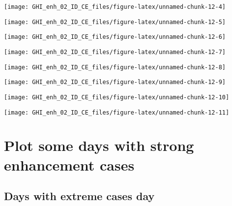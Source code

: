 \documentclass[
  10pt,
  a4paper,oneside]{article}
\begin{document}
\begin{center}\texttt{[image: GHI\_enh\_02\_ID\_CE\_files/figure-latex/unnamed-chunk-12-4]} \end{center}

\begin{center}\texttt{[image: GHI\_enh\_02\_ID\_CE\_files/figure-latex/unnamed-chunk-12-5]} \end{center}

\begin{center}\texttt{[image: GHI\_enh\_02\_ID\_CE\_files/figure-latex/unnamed-chunk-12-6]} \end{center}

\begin{center}\texttt{[image: GHI\_enh\_02\_ID\_CE\_files/figure-latex/unnamed-chunk-12-7]} \end{center}

\begin{center}\texttt{[image: GHI\_enh\_02\_ID\_CE\_files/figure-latex/unnamed-chunk-12-8]} \end{center}

\begin{center}\texttt{[image: GHI\_enh\_02\_ID\_CE\_files/figure-latex/unnamed-chunk-12-9]} \end{center}

\begin{center}\texttt{[image: GHI\_enh\_02\_ID\_CE\_files/figure-latex/unnamed-chunk-12-10]} \end{center}

\begin{center}\texttt{[image: GHI\_enh\_02\_ID\_CE\_files/figure-latex/unnamed-chunk-12-11]} \end{center}

\FloatBarrier

\hypertarget{plot-some-days-with-strong-enhancement-cases}{%
\section{Plot some days with strong enhancement cases}\label{plot-some-days-with-strong-enhancement-cases}}

\FloatBarrier

\hypertarget{days-with-extreme-cases-day}{%
\subsection{Days with extreme cases day}\label{days-with-extreme-cases-day}}
\end{document}
